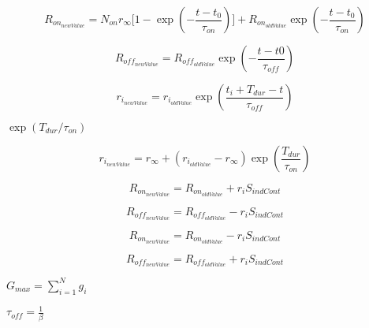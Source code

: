 \documentclass{article}
\begin{document}
\begin{equation} R_{on_{newValue}} = N_{on}r_{\infty}\Bigg[1-\exp\left(-\frac{t-t_0}{\tau_{on}}\right)\Bigg] + R_{on_{oldValue}}\exp\left(-\frac{t-t_0}{\tau_{on}}\right) \end{equation}
\pagebreak

\begin{equation} R_{off_{newValue}} = R_{off_{oldValue}}\exp\left(-\frac{t - t0}{\tau_{off}} \right) \end{equation}
\pagebreak

\begin{equation} r_{i_{newValue}} = r_{i_{oldValue}} \exp\left(\frac{t_i+T_{dur}-t}{\tau_{off}}\right) \end{equation}
\pagebreak

$\exp(T_{dur}/\tau_{on})$
\pagebreak

\begin{equation} r_{i_{newValue}} = r_{\infty} + (r_{i_{oldValue}} - r_{\infty}) \exp\left(\frac{T_{dur}}{\tau_{on}}\right) \end{equation}
\pagebreak

\begin{equation} R_{on_{newValue}} = R_{on_{oldValue}} + r_iS_{indCont} \end{equation}
\pagebreak

\begin{equation} R_{off_{newValue}} = R_{off_{oldValue}} - r_iS_{indCont} \end{equation}
\pagebreak

\begin{equation} R_{on_{newValue}} = R_{on_{oldValue}} - r_iS_{indCont} \end{equation}
\pagebreak

\begin{equation} R_{off_{newValue}} = R_{off_{oldValue}} + r_iS_{indCont} \end{equation}
\pagebreak

$G_{max} = \limits\sum_{i=1}^Ng_i$
\pagebreak

$\tau_{off}=\frac{1}{\beta}$
\pagebreak
\end{document}
